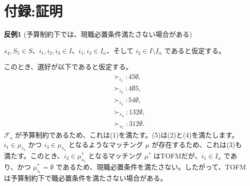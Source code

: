 \documentclass[12pt, a4paper]{article}
\theoremstyle{definition}
\theoremstyle{remark}
\theoremstyle{plain}
\begin{document}
\section*{付録:証明}

  

\textbf{反例1} (予算制約下では、現職必置条件満たさない場合がある)

$s_4, S_5 \in S$、$i_1, i_2, i_3 \in I$、$i_1, i_3 \in I_\alpha$、そして $i_2 \in I \setminus I_\alpha$ であると仮定する。

このとき、選好が以下であると仮定する。
\begin{align*}
    &\succ_{i_1}: 45\emptyset, \\
    &\succ_{i_2}: 4\emptyset 5, \\
    &\succ_{i_3}: 54\emptyset, \\
    &\succ_{s_4}: 132\emptyset, \\
    &\succ_{s_5}: 312\emptyset. \tag{5}
\end{align*}
$\mathcal{F}_s$ が予算制約であるため、これは(1)を満たす。(5)は(2)と(4)を満たします。$i_1 \in \mu_{s_5}$ かつ $i_3 \in \mu_{s_4}$ となるようなマッチング $\mu$ が存在するため、これは(3)も満たす。このとき、$i_3 \in \mu^*_{s_5}$ となるマッチング $\mu^*$ はTOFMだが、$i_1 \in I_\alpha$ であり、かつ $\mu^*_{i_1} = \emptyset$ であるため、現職必置条件を満たさない。したがって、TOFMは予算制約下で職必置条件を満たさない場合がある。
\end{document}

